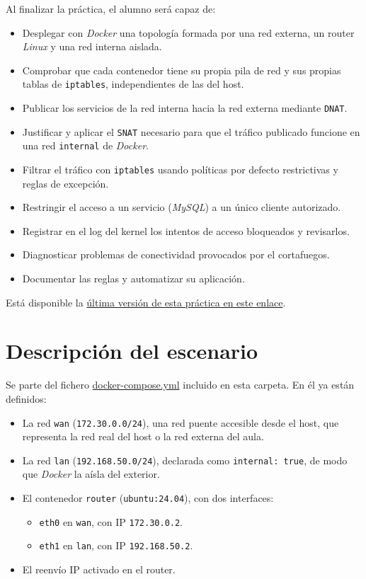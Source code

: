 \documentclass[a4paper]{article}
\begin{document}
Al finalizar la práctica, el alumno será capaz de:

\begin{itemize}
\item Desplegar con \emph{Docker} una topología formada por una red externa, un router \emph{Linux} y una red interna aislada.
\item Comprobar que cada contenedor tiene su propia pila de red y sus propias tablas de \texttt{iptables}, independientes de las del host.
\item Publicar los servicios de la red interna hacia la red externa mediante \texttt{DNAT}.
\item Justificar y aplicar el \texttt{SNAT} necesario para que el tráfico publicado funcione en una red \texttt{internal} de \emph{Docker}.
\item Filtrar el tráfico con \texttt{iptables} usando políticas por defecto restrictivas y reglas de excepción.
\item Restringir el acceso a un servicio (\emph{MySQL}) a un único cliente autorizado.
\item Registrar en el log del kernel los intentos de acceso bloqueados y revisarlos.
\item Diagnosticar problemas de conectividad provocados por el cortafuegos.
\item Documentar las reglas y automatizar su aplicación.
\end{itemize}

Está disponible la \href{https://alvarogonzalezsotillo.github.io/apuntes-clase/seguridad-alta-disponibilidad/apuntes/4/sad-04-practica-cortafuegos-docker.pdf}{última versión de esta práctica en este enlace}.
\section{Descripción del escenario}
\label{sec:org50b1518}

Se parte del fichero \href{docker-compose.yml}{docker-compose.yml} incluido en esta carpeta. En él ya están definidos:

\begin{itemize}
\item La red \texttt{wan} (\texttt{172.30.0.0/24}), una red puente accesible desde el host, que representa la red real del host o la red externa del aula.
\item La red \texttt{lan} (\texttt{192.168.50.0/24}), declarada como \texttt{internal: true}, de modo que \emph{Docker} la aísla del exterior.
\item El contenedor \texttt{router} (\texttt{ubuntu:24.04}), con dos interfaces:
\begin{itemize}
\item \texttt{eth0} en \texttt{wan}, con IP \texttt{172.30.0.2}.
\item \texttt{eth1} en \texttt{lan}, con IP \texttt{192.168.50.2}.
\end{itemize}
\item El reenvío IP activado en el router.
\end{itemize}
\end{document}
